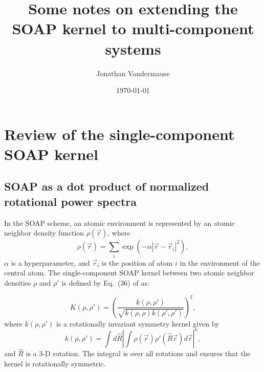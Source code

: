 \documentclass[%
preprint,
amsmath,amssymb,
aps,
]{revtex4-1}
\begin{document}
\title{Some notes on extending the SOAP kernel to multi-component systems}

\author{Jonathan Vandermause}

\date{\today}


\maketitle

\section{Review of the single-component SOAP kernel}

\subsection{SOAP as a dot product of normalized rotational power spectra}

In the SOAP scheme, an atomic environment is represented by an atomic neighbor density function $\rho(\vec{r})$, where
\begin{equation}
\rho(\vec{r}) = \sum_i \exp\left(-\alpha | \vec{r} - \vec{r}_i|^2 \right),
\end{equation}
$\alpha$ is a hyperparameter, and $\vec{r}_i$ is the position of atom $i$ in the environment of the central atom. The single-component SOAP kernel between two atomic neighbor densities $\rho$ and $\rho'$ is defined by Eq.\ (36) of \cite{bartok2013representing} as:

\begin{equation}
    K(\rho, \rho') = \left(\frac{k (\rho, \rho')}{\sqrt{k(\rho, \rho) k(\rho', \rho')}} \right) ^{\xi},
\end{equation}
where $k(\rho, \rho')$ is a rotationally invariant symmetry kernel given by
\begin{equation}
k(\rho, \rho') = \int d\hat{R} \left| \int \rho(\vec{r}) \rho'(\hat{R}\vec{r}) d\vec{r} \right| ^n,
\end{equation}
and $\hat{R}$ is a 3-D rotation. The integral is over all rotations and ensures that the kernel is rotationally symmetric.
\end{document}

